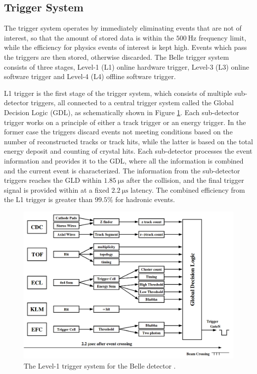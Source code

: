 \documentclass[headings=standardclasses,headings=big,oneside,a4paper,openany,12pt]{scrbook}
\newcommand {\e}[1]{\mathrm{~#1}}
\begin{document}
\subsection{Trigger System}
The trigger system operates by immediately eliminating events that are not of interest, so that the amount of stored data is within the $500\e{Hz}$ frequency limit, while the efficiency for physics events of interest is kept high. Events which pass the triggers are then stored, otherwise discarded. The Belle trigger system consists of three stages, Level-1 (L1) online hardware trigger, Level-3 (L3) online software trigger and Level-4 (L4) offline software trigger.

L1 trigger is the first stage of the trigger system, which consists of multiple sub-detector triggers, all connected to a central trigger system called the Global Decision Logic (GDL), as schematically shown in Figure \ref{fig:TRG_GDL}. Each sub-detector trigger works on a principle of either a track trigger or an energy trigger. In the former case the triggers discard events not meeting conditions based on the number of reconstructed tracks or track hits, while the latter is based on the total energy deposit and counting of crystal hits. Each sub-detector processes the event information and provides it to the GDL, where all the information is combined and the current event is characterized. The information from the sub-detector triggers reaches the GLD within $1.85\e{\mu s}$ after the collision, and the final trigger signal is provided within at a fixed $2.2\e{\mu s}$ latency. The combined efficiency from the L1 trigger is greater than $99.5\%$ for hadronic events.

\begin{figure}[H]
	\centering
	\captionsetup{width=0.8\linewidth}
	\includegraphics[width=0.8\linewidth]{fig/setup/TRG_GDL}
	\caption{The Level-1 trigger system for the Belle detector \cite{ABASHIAN2002117}.}
	\label{fig:TRG_GDL}
\end{figure}
\end{document}
